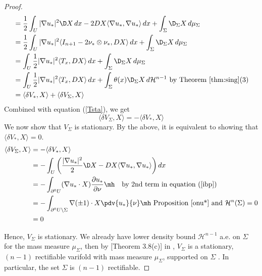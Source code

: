 \begin{proof}
\begin{align*}
    &= \frac{1}{2} \int_{U}|\nabla u_*|^2 \D X \,dx - 2DX\langle\nabla u_*,\nabla u_*\rangle \,dx+ \int_{\Sigma} \D_{\Sigma} X \,d\mu_{\Sigma}  \\
    &= \frac{1}{2} \int_{U}|\nabla u_*|^2 \langle I_{n+1} - 2 \nu_* \otimes \nu_* , DX \rangle \,dx + \int_{\Sigma} \D_{\Sigma} X \,d\mu_{\Sigma}  \\
    &=  \int_{U} \frac{1}{2}|\nabla u_*|^2 \langle T_x , DX \rangle \,dx + \int_{\Sigma} \D_{\Sigma} X \,d\mu_{\Sigma}                  \\
    &= \int_{U} \frac{1}{2}|\nabla u_*|^2 \langle T_x , DX \rangle \,dx + \int_{\Sigma} \theta(x) \D_{\Sigma} X \,d\mathcal{H}^{n-1} \text{ by Theorem \ref{thm:sing}}(3) \\
    &= \langle \delta V_*,X \rangle + \langle \delta V_{\Sigma},X \rangle 
\end{align*}
 Combined with equation (\ref{Tsta}), we get
$$\langle \delta V_{\Sigma},X \rangle  = -\langle \delta V_*,X \rangle$$
 We now show that $V_{\Sigma}$ is stationary. By the above, it is equivalent to showing that $\langle \delta V_*, X \rangle = 0$.
\begin{align*}
    \langle \delta V_{\Sigma},X \rangle 
    &= -\langle \delta V_*, X \rangle \\
    &= -\int_{U} \bigg( \frac{|\nabla u_*|^2}{2} \D X - DX\langle\nabla u_*,\nabla u_*\rangle \bigg)\,dx  \\
    &=-\int_{\partial^0U} (\nabla u_* \cdot X)\frac{\partial u_*}{\partial \nu} \mh \quad \text{by 2nd term in equation (\ref{ibp})} \\
    &= -\int_{\partial^0U \backslash \Sigma}\nabla(\pm 1)\cdot X \pdv{u_*}{\nu} \mh \text{ Proposition \ref{onu*} and } \mathcal{H}^n(\Sigma)=0   \\
    &= 0 
\end{align*}

 Hence, $V_{\Sigma}$ is stationary. We already have lower density bound $\mathcal{H}^{n-1}$ a.e. on $\Sigma$ for the mass measure $\mu_{\Sigma}$,  then by [Theorem 3.8(c)] in \cite{as}, $V_{\Sigma}$ is a stationary, $(n-1)$ rectifiable varifold with mass measure $\mu_{\Sigma}$, supported on $\Sigma$ . In particular, the set $\Sigma$ is $(n-1)$ rectifiable.
\end{proof}
